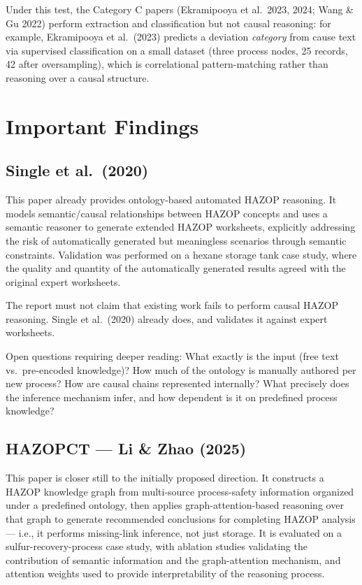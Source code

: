 Under this test, the Category C papers (Ekramipooya et al.\ 2023, 2024; Wang \& Gu 2022) perform extraction and classification but not causal reasoning: for example, Ekramipooya et al.\ (2023) predicts a deviation \emph{category} from cause text via supervised classification on a small dataset (three process nodes, 25 records, 42 after oversampling), which is correlational pattern-matching rather than reasoning over a causal structure.

\section{Important Findings}

\subsection{Single et al.\ (2020)}
This paper already provides ontology-based automated HAZOP reasoning. It models semantic/causal relationships between HAZOP concepts and uses a semantic reasoner to generate extended HAZOP worksheets, explicitly addressing the risk of automatically generated but meaningless scenarios through semantic constraints. Validation was performed on a hexane storage tank case study, where the quality and quantity of the automatically generated results agreed with the original expert worksheets.

\begin{constraint}
The report must not claim that existing work fails to perform causal HAZOP
reasoning. Single et al.\ (2020) already does, and validates it against
expert worksheets.
\end{constraint}

Open questions requiring deeper reading: What exactly is the input (free text vs.\ pre-encoded knowledge)? How much of the ontology is manually authored per new process? How are causal chains represented internally? What precisely does the inference mechanism infer, and how dependent is it on predefined process knowledge?

\subsection{HAZOPCT --- Li \& Zhao (2025)}
This paper is closer still to the initially proposed direction. It constructs a HAZOP knowledge graph from multi-source process-safety information organized under a predefined ontology, then applies graph-attention-based reasoning over that graph to generate recommended conclusions for completing HAZOP analysis --- i.e., it performs missing-link inference, not just storage. It is evaluated on a sulfur-recovery-process case study, with ablation studies validating the contribution of semantic information and the graph-attention mechanism, and attention weights used to provide interpretability of the reasoning process.

